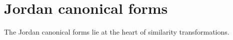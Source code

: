 \section{Jordan canonical forms}

The Jordan canonical forms lie at the heart of similarity transformations.





\endinput